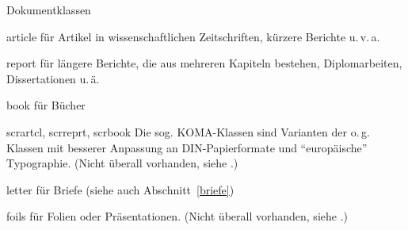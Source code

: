 \begin{table}[hbpt]
\caption{Dokumentklassen} \label{docstyles}
\oben{11cm}
\begin{ttdescription}%
\item [article] für Artikel in wissenschaftlichen Zeitschriften,
  kürzere Berichte u.\,v.\,a.
 
\item [report] für längere Berichte, die aus mehreren Kapiteln
  bestehen, Diplomarbeiten, Dissertationen u.\,ä.
 
\item [book] für Bücher

\item[scrartcl, scrreprt, scrbook]\quad Die sog. KOMA-Klassen 
sind Varianten der o.\,g. Klassen
mit besserer Anpassung an DIN-Papierformate und "`europäische"'
Typographie. 
(Nicht überall vorhanden, siehe \local.)


\item [letter] für Briefe (siehe auch Abschnitt~\ref{briefe})

\item [foils] für Folien oder Präsentationen.
(Nicht überall vorhanden, siehe \local.)
  
\end{ttdescription}
\unten
\end{table}

